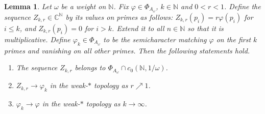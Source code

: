 \documentclass[10pt,a4paper]{amsart}
\newtheorem{lemma}{Lemma}
\begin{document}
\begin{lemma}\label{lem:character_approx}
Let $\omega$ be a weight on $\mathbb N$. Fix $\varphi \in \Phi_{A_\omega}$, $k \in \mathbb N$ and $0 < r < 1$. Define the sequence $Z_{k,r} \in \mathbb C^{\mathbb N}$ by its values on primes as follows: $Z_{k,r}(p_i) = r \varphi(p_i)$ for $i \leq k$, and $Z_{k,r}(p_i) = 0$ for $i > k$. Extend it to all $n \in \mathbb N$ so that it is multiplicative. Define $\varphi_k \in \Phi_{A_\omega}$ to be the semicharacter matching $\varphi$ on the first $k$ primes and vanishing on all other primes. Then the following statements hold.
\begin{enumerate}
    \item The sequence $Z_{k,r}$ belongs to $\Phi_{A_\omega} \cap c_0(\mathbb N, 1/\omega)$.
    \item $Z_{k,r}\to\varphi_k$ in the weak-$\ast$ topology as $r \nearrow 1$.
    \item $\varphi_k\to\varphi$ in the weak-$\ast$ topology as $k \to \infty$.
\end{enumerate}
\end{lemma}
\end{document}
